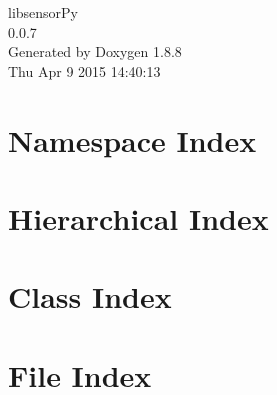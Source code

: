 \documentclass[twoside]{book}
\newcommand{\+}{\discretionary{\mbox{\scriptsize$\hookleftarrow$}}{}{}}
\newcommand{\clearemptydoublepage}{%
  \newpage{\pagestyle{empty}\cleardoublepage}%
}
\begin{document}
\hypersetup{pageanchor=false,
             bookmarks=true,
             bookmarksnumbered=true,
             pdfencoding=unicode
            }
\begin{titlepage}
\vspace*{7cm}
\begin{center}%
{\Large libsensor\+Py \\[1ex]\large 0.\+0.\+7 }\\
\vspace*{1cm}
{\large Generated by Doxygen 1.8.8}\\
\vspace*{0.5cm}
{\small Thu Apr 9 2015 14:40:13}\\
\end{center}
\end{titlepage}
\clearemptydoublepage
\tableofcontents
\clearemptydoublepage
{}
\hypersetup{pageanchor=true}

\chapter{Namespace Index}

\chapter{Hierarchical Index}

\chapter{Class Index}

\chapter{File Index}

\end{document}
